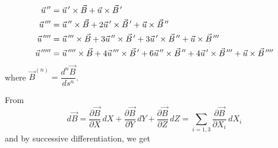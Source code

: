 \begin{equation}
	\begin{aligned}
		\vec  u^{\,\prime\prime}
		         &   =   \vec  u^{\,\prime}   \times   \vec  B + \vec  u  \times  
		         \vec B^{\,\prime} \\
		\vec u^{\,\prime\prime\prime}
		         & = \vec  u^{\,\prime\prime}   \times   \vec  B 
		         + 2\vec  u^{\,\prime}  \times   \vec  B^{\,\prime}  
		         + \vec  u \times  \vec  B^{\,\prime\prime} \\
		\vec u^{\,\prime\prime\prime\prime} 
		         &   =  \vec u^{\,\prime\prime\prime}  \times   \vec  B 
		         + 3\vec  u^{\,\prime\prime}   \times  \vec  B^{\,\prime}  
		         + 3\vec  u^{\,\prime}   \times   \vec  B^{\,\prime\prime}   
		         +\vec	u  \times  \vec  B^{\,\prime\prime\prime} \\
		\vec  u^{\,\prime\prime\prime\prime\prime}
		         &  =  \vec u^{\,\prime\prime\prime\prime}  \times \vec  B 
		         + 4\vec u^{\,\prime\prime\prime}  \times  \vec  B^{\,\prime}  
		         + 6\vec  u^{\,\prime\prime} \times   \vec  B^{\,\prime\prime}  
		         + 4\vec  u^{\,\prime}   \times   \vec B^{\,\prime\prime\prime} 
		         + \vec  u  \times   \vec  B^{\,\prime\prime\prime\prime}
	\end{aligned}
	\label{eq2-2-6}
\end{equation}
%
 where $ \vec  B^{(n)} = \dfrac{d^n\vec  B}{ds^n}$. 

\noindent From  
\begin{equation} d\vec  B = \dfrac{\partial\vec  B}{\partial X}\, dX
     +\dfrac{\partial\vec  B}{\partial Y}\, dY+
     \dfrac{\partial\vec  B}{\partial Z}\, dZ
     = \sum_{i=1,3}\dfrac{\partial\vec  B}{\partial X_i}\, dX_i
 	\label{eq2-2-7a}
\end{equation}
and by successive differentiation, we get 

